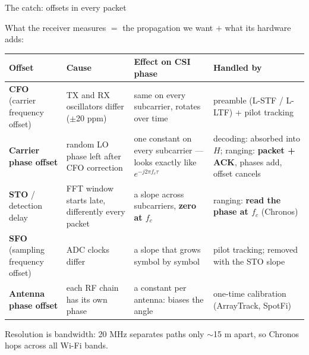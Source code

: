 \begin{frame}{The catch: offsets in every packet}
  \vspace{0.3em}
  \centering
  {\small What the receiver measures $=$ the propagation we want $+$ what its hardware adds:\par}

  \vspace{0.5em}
  {\scriptsize\setlength{\tabcolsep}{3pt}\renewcommand{\arraystretch}{1.12}%
  \begin{tabular}{@{}>{\raggedright\arraybackslash}p{}
                  >{\raggedright\arraybackslash}p{}
                  >{\raggedright\arraybackslash}p{}
                  >{\raggedright\arraybackslash}p{}@{}}
    \toprule
    \textbf{Offset} & \textbf{Cause} & \textbf{Effect on CSI phase} & \textbf{Handled by} \\
    \midrule
    \textbf{CFO} (carrier frequency offset) & TX and RX oscillators differ ($\pm$20 ppm)
      & same on every subcarrier, rotates over time
      & preamble (L-STF / L-LTF) + pilot tracking \\
    \textbf{Carrier phase offset} & random LO phase left after CFO correction
      & one constant on every subcarrier --- looks exactly like $e^{-j2\pi f_c\tau}$
      & decoding: absorbed into $H$; ranging: \textbf{packet + ACK}, phases add, offset cancels \\
    \textbf{STO} / detection delay & FFT window starts late, differently every packet
      & a slope across subcarriers, \textbf{zero at $f_c$}
      & ranging: \textbf{read the phase at $f_c$} (Chronos) \\
    \textbf{SFO} (sampling frequency offset) & ADC clocks differ
      & a slope that grows symbol by symbol
      & pilot tracking; removed with the STO slope \\
    \textbf{Antenna phase offset} & each RF chain has its own phase
      & a constant per antenna: biases the angle
      & one-time calibration (ArrayTrack, SpotFi) \\
    \bottomrule
  \end{tabular}\par}

  \vspace{0.3em}
  {\scriptsize\raggedright Resolution is bandwidth: 20 MHz separates paths only
   $\sim$15 m apart, so Chronos hops across all Wi-Fi bands.\par}
\end{frame}

